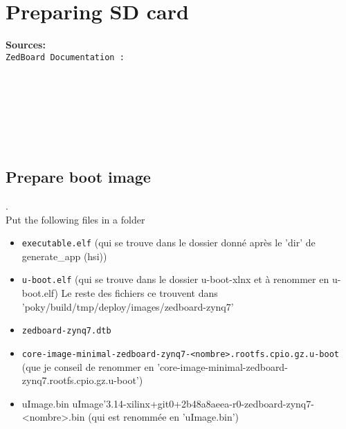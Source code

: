 \chapter{Preparing SD card}

\textbf{Sources:}\\
\texttt{ZedBoard Documentation :}\\
\\ \vspace{5pt}

\\ \vspace{5pt}

\\ \vspace{5pt}

\\ \vspace{5pt}

\section{Prepare boot image}
\label{sec:prepate_boot_image}
.\\

Put the following files in a folder
\begin{itemize}[label=$\bullet$]
\item \texttt{executable.elf} (qui se trouve dans le dossier donné après le 'dir' de generate\_app (hsi))
\item \texttt{u-boot.elf} (qui se trouve dans le dossier u-boot-xlnx et à renommer en u-boot.elf)
Le reste des fichiers ce trouvent dans 'poky/build/tmp/deploy/images/zedboard-zynq7'
\item \texttt{zedboard-zynq7.dtb}
\item \texttt{core-image-minimal-zedboard-zynq7-<nombre>.rootfs.cpio.gz.u-boot} (que je conseil de renommer en 'core-image-minimal-zedboard-zynq7.rootfs.cpio.gz.u-boot')
\item {uImage.bin} uImage'3.14-xilinx+git0+2b48a8aeea-r0-zedboard-zynq7-<nombre>.bin (qui est renommée en 'uImage.bin')
\end{itemize}

